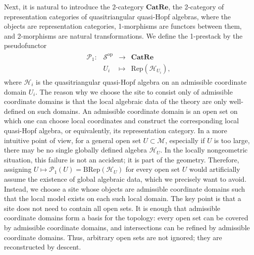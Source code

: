 \documentclass[reqno]{amsart}
\theoremstyle{definition}
\theoremstyle{remark}
\begin{document}
Next, it is natural to introduce the 2-category $\textbf{CatRe}$, the 2-category of representation categories of quasitriangular quasi-Hopf algebras, where the objects are representation categories, 1-morphisms are functors between them, and 2-morphisms are natural transformations. We define the 1-prestack by the pseudofunctor
\begin{equation}
    \begin{split}
        \begin{array}{rccc}
\mathscr{P}_1: & \mathscr{S}^{\text{op}} & \longrightarrow & \textbf{CatRe} \\
   & U_i & \longmapsto  & \text{Rep}(\mathscr{H}_{U_i}),
\end{array}
    \end{split}
\end{equation}
where $\mathscr{H}_i$ is the quasitriangular quasi-Hopf algebra on an admissible coordinate domain $U_i$. The reason why we choose the site to consist only of admissible coordinate domains is that the local algebraic data of the theory are only well-defined on such domains. An admissible coordinate domain is an open set on which one can choose local coordinates and construct the corresponding local quasi-Hopf algebra, or equivalently, its representation category. In a more intuitive point of view, for a general open set $U\subset \mathcal{M}$, especially if $U$ is too large, there may be no single globally defined algebra $\mathscr{H}_U$. In the locally nongeometric situation, this failure is not an accident; it is part of the geometry. Therefore, assigning $U \longmapsto \mathscr{P}_1(U)=\text{BRep}(\mathscr{H}_U)$ for every open set $U$ would artificially assume the existence of global algebraic data, which we precisely want to avoid. Instead, we choose a site whose objects are admissible coordinate domains such that the local model exists on each such local domain. The key point is that a site does not need to contain all open sets. It is enough that admissible coordinate domains form a basis for the topology: every open set can be covered by admissible coordinate domains, and intersections can be refined by admissible coordinate domains. Thus, arbitrary open sets are not ignored; they are reconstructed by descent.
\end{document}
